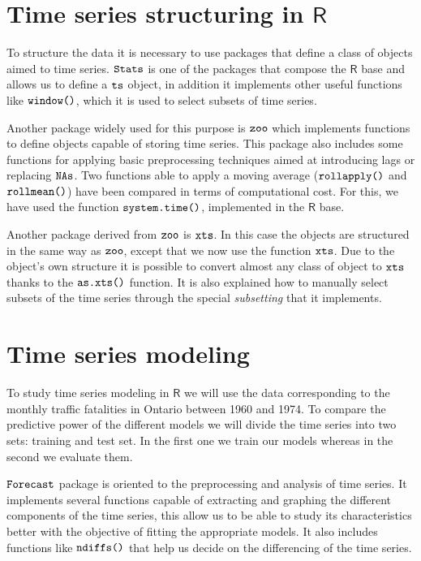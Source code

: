 \documentclass[12pt,a4paper,oneside]{article}
\begin{document}
\section*{Time series structuring in $\textsf{R}$}
To structure the data it is necessary to use packages that define a class of objects aimed to time series. $\verb!Stats!$ is one of the packages that compose the $\textsf{R}$ base and allows us to define a $\verb!ts!$ object, in addition it implements other useful functions like $\verb!window()!$, which it is used to select subsets of time series.

Another package widely used for this purpose is $\verb!zoo!$ which implements functions to define objects capable of storing time series. This package also includes some functions for applying basic preprocessing techniques aimed at introducing lags or replacing $\verb!NAs!$. Two functions able to apply a moving average ($\verb!rollapply()!$ and $\verb!rollmean()!$) have been compared in terms of computational cost.  For this, we have used the function $\verb!system.time()!$, implemented in the $\textsf{R}$ base.

Another package derived from $\verb!zoo!$ is $\verb!xts!$. In this case the objects are structured in the same way as $\verb!zoo!$, except that we now use the function $\verb!xts!$. Due to the object’s own structure it is possible to convert almost any class of object to $\verb!xts!$ thanks to the $\verb!as.xts()!$ function. It is also explained how to manually select subsets of the time series through the special \textit{subsetting} that it implements.

\section*{Time series modeling}
To study time series modeling in $\textsf{R}$ we will use the data corresponding to the monthly traffic fatalities in Ontario between 1960 and 1974. To compare the predictive power of the different models we will divide the time series into two sets: training and test set. In the first one we train our models whereas in the second we evaluate them.

$\verb!Forecast!$ package is oriented to the preprocessing and analysis of time series. It implements several functions capable of extracting and graphing the different components of the time series, this allow us to be able to study its characteristics better with the objective of fitting the appropriate models. It also includes functions like $\verb!ndiffs()!$ that help us decide on the differencing of the time series.
\end{document}
